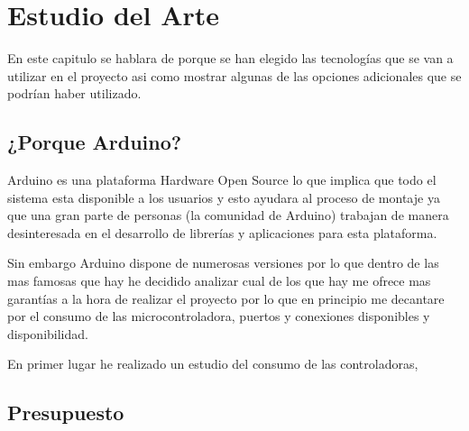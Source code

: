 
\chapter{Estudio del Arte}

\setlength{\parindent}{5ex}En este capitulo se hablara de porque se han elegido las tecnologías que se van a utilizar en el proyecto asi como mostrar algunas de las opciones adicionales que se podrían haber utilizado. 

\section{¿Porque Arduino?}

Arduino es una plataforma Hardware Open Source lo que implica que todo el sistema esta disponible a los usuarios y esto ayudara al proceso de montaje ya que una gran parte de personas (la comunidad de Arduino) trabajan de manera desinteresada en el desarrollo de librerías y aplicaciones para esta plataforma. 
\setlength{\parindent}{0ex}

Sin embargo Arduino dispone de numerosas versiones por lo que dentro de las mas famosas que hay he decidido analizar cual de los que hay me ofrece mas garantías a la hora de realizar el proyecto por lo que en principio me decantare por el consumo de las microcontroladora, puertos y conexiones disponibles y disponibilidad.

En primer lugar he realizado un estudio del consumo de las controladoras, 

\section{Presupuesto}
